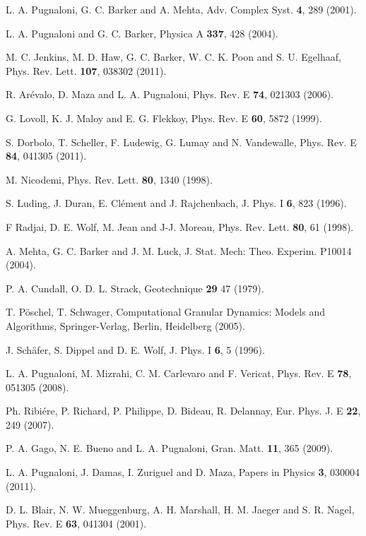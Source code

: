 \begin{thebibliography}{50}
 L. A. Pugnaloni, G. C. Barker and A. Mehta, Adv. Complex Syst. \textbf{4}, 289 (2001).

 L. A. Pugnaloni and G. C. Barker, Physica A \textbf{337}, 428 (2004). 

 M. C. Jenkins, M. D. Haw, G. C. Barker, W. C. K. Poon and S. U. Egelhaaf, Phys. Rev. Lett. \textbf{107}, 038302 (2011).

 R. Ar\'{e}valo, D. Maza and L. A. Pugnaloni, Phys. Rev. E \textbf{74}, 021303 (2006).

 G. Lovoll, K. J. Maloy and E. G. Flekkoy, Phys. Rev. E \textbf{60}, 5872 (1999).

 S. Dorbolo, T. Scheller, F. Ludewig, G. Lumay and N. Vandewalle, Phys. Rev. E \textbf{84}, 041305 (2011).

 M. Nicodemi, Phys. Rev. Lett. \textbf{80}, 1340 (1998).

 S. Luding, J. Duran, E. Cl\'{e}ment and J. Rajchenbach, J. Phys. I \textbf{6}, 823 (1996).

 F Radjai, D. E. Wolf, M. Jean and J-J. Moreau, Phys. Rev. Lett. \textbf{80}, 61 (1998).

 A. Mehta, G. C. Barker and J. M. Luck, J. Stat. Mech: Theo. Experim. P10014 (2004). 

 P. A. Cundall, O. D. L. Strack, Geotechnique \textbf{29} 47 (1979).

 T. P\"{o}schel, T. Schwager, Computational Granular Dynamics: Models and Algorithms, Springer-Verlag, Berlin, Heidelberg (2005).

 J. Sch\"{a}fer, S. Dippel and D. E. Wolf, J. Phys. I \textbf{6}, 5 (1996).

 L. A. Pugnaloni, M. Mizrahi, C. M. Carlevaro and F. Vericat, Phys. Rev. E \textbf{78}, 051305 (2008).

 Ph. Ribi\'{e}re, P. Richard, P. Philippe, D. Bideau, R. Delannay, Eur. Phys. J. E \textbf{22}, 249 (2007).

 P. A. Gago, N. E. Bueno and L. A. Pugnaloni, Gran. Matt. \textbf{11}, 365 (2009).

 L. A. Pugnaloni, J. Damas, I. Zuriguel and D. Maza, Papers in Physics \textbf{3}, 030004 (2011).

 D. L. Blair, N. W. Mueggenburg, A. H. Marshall, H. M. Jaeger and S. R. Nagel, Phys. Rev. E \textbf{63}, 041304 (2001).


\end{thebibliography}
